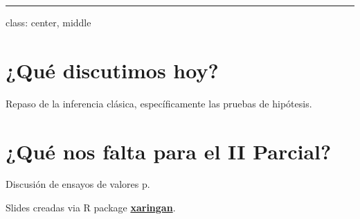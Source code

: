 \documentclass[
]{article}
\begin{document}
\begin{center}\rule{0.5\linewidth}{0.5pt}\end{center}

class: center, middle

\hypertarget{quuxe9-discutimos-hoy}{%
\section{¿Qué discutimos hoy?}\label{quuxe9-discutimos-hoy}}

Repaso de la inferencia clásica, específicamente las pruebas de
hipótesis.

\hypertarget{quuxe9-nos-falta-para-el-ii-parcial}{%
\section{¿Qué nos falta para el II
Parcial?}\label{quuxe9-nos-falta-para-el-ii-parcial}}

Discusión de ensayos de valores p.

Slides creadas via R package
\href{https://github.com/yihui/xaringan}{\textbf{xaringan}}.
\end{document}
